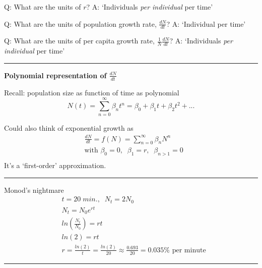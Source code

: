 \documentclass{article}
\newcommand{\note}[1]{\colorbox{gray!20}{#1}}
\begin{document}
\note{Q:}  What are the units of $r$?
\note{A:} `Individuals \emph{per individual} per time'

\note{Q:}  What are the units of population growth rate, $\tfrac{dN}{dt}$?
\note{A:} `Individual per time'

\note{Q:}  What are the units of per capita growth rate, $\tfrac{1}{N}\tfrac{dN}{dt}$?
\note{A:} `Individuals \emph{per individual} per time'

\rule[0.5ex]{\linewidth}{1pt}

\textbf{Polynomial representation of $\frac{dN}{dt}$}

Recall: population size as function of time as polynomial
\begin{equation*}
	N(t)=\sum_{n=0}^\infty \beta_n t^n = \beta_0 + \beta_1 t + \beta_2 t^2 +...
\end{equation*}


Could also think of exponential growth as
\begin{align*}
&	\frac{dN}{dt}=f(N)=\sum_{n=0}^\infty \beta_n N^n \\
& 	\text{with } \beta_0=0, \;\; \beta_1 = r, \;\; \beta_{n>1}=0\\
\end{align*}
It's a `first-order' approximation.

\rule[0.5ex]{\linewidth}{1pt}

\note{Monod's nightmare}
\begin{align*}
&	t=20 \; min.,  \;\; N_t = 2N_0\\
&	N_t=N_0 e^{rt}\\
&	ln\left(\frac{N_t}{N_0}\right)=rt\\
&	ln(2)=rt\\
&	r=\frac{ln(2)}{t}=\frac{ln(2)}{20} \approx \frac{0.693}{20} = 0.035\% \text{ per minute}
\end{align*}


\rule[0.5ex]{\linewidth}{1pt}
\end{document}
